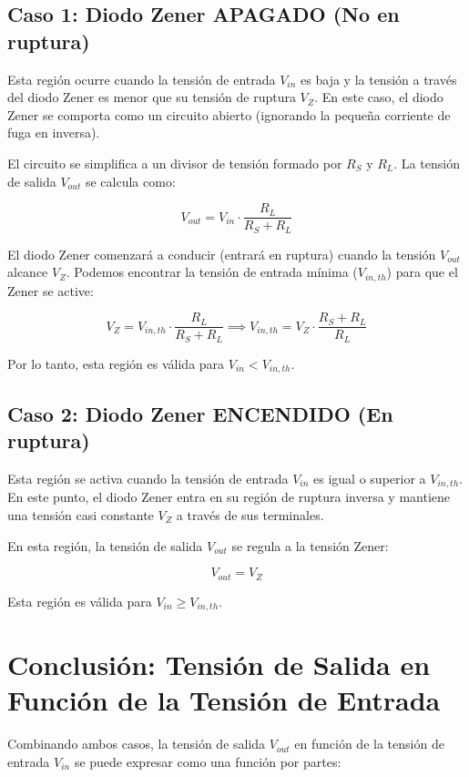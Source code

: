 \documentclass[12pt, a4paper]{article}
\begin{document}
\subsection*{Caso 1: Diodo Zener APAGADO (No en ruptura)}

Esta región ocurre cuando la tensión de entrada $V_{in}$ es baja y la tensión a través del diodo Zener es menor que su tensión de ruptura $V_Z$. En este caso, el diodo Zener se comporta como un circuito abierto (ignorando la pequeña corriente de fuga en inversa).

El circuito se simplifica a un divisor de tensión formado por $R_S$ y $R_L$. La tensión de salida $V_{out}$ se calcula como:

\begin{equation}
    V_{out} = V_{in} \cdot \frac{R_L}{R_S + R_L}
\end{equation}

El diodo Zener comenzará a conducir (entrará en ruptura) cuando la tensión $V_{out}$ alcance $V_Z$. Podemos encontrar la tensión de entrada mínima ($V_{in,th}$) para que el Zener se active:

\begin{equation}
    V_Z = V_{in,th} \cdot \frac{R_L}{R_S + R_L} \implies V_{in,th} = V_Z \cdot \frac{R_S + R_L}{R_L}
\end{equation}

Por lo tanto, esta región es válida para $V_{in} < V_{in,th}$.

\subsection*{Caso 2: Diodo Zener ENCENDIDO (En ruptura)}

Esta región se activa cuando la tensión de entrada $V_{in}$ es igual o superior a $V_{in,th}$. En este punto, el diodo Zener entra en su región de ruptura inversa y mantiene una tensión casi constante $V_Z$ a través de sus terminales.

En esta región, la tensión de salida $V_{out}$ se regula a la tensión Zener:

\begin{equation}
    V_{out} = V_Z
\end{equation}

Esta región es válida para $V_{in} \ge V_{in,th}$.

\section*{Conclusión: Tensión de Salida en Función de la Tensión de Entrada}
Combinando ambos casos, la tensión de salida $V_{out}$ en función de la tensión de entrada $V_{in}$ se puede expresar como una función por partes:
\end{document}
